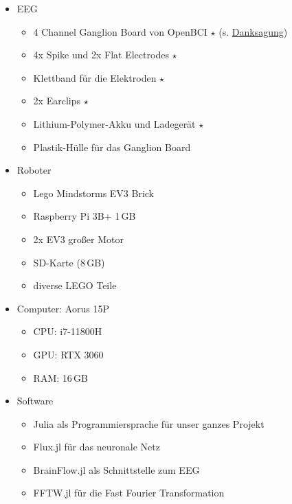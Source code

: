 \documentclass[11pt]{scrartcl}
\begin{document}
	\begin{itemize}
		\item EEG
		\begin{itemize}
			\item 4 Channel Ganglion Board von OpenBCI $\star$ (s. \hyperref[Foerderverein]{Danksagung})
			\item 4x Spike und 2x Flat Electrodes  $\star$
			\item Klettband für die Elektroden $\star$
			\item 2x Earclips $\star$
			\item Lithium-Polymer-Akku und Ladegerät $\star$
			\item Plastik-Hülle für das Ganglion Board
		\end{itemize}

		\item Roboter
		\begin{itemize}
			\item Lego Mindstorms EV3 Brick
			\item Raspberry Pi 3B+ 1\,GB
			\item 2x EV3 großer Motor
			\item SD-Karte (8\,GB)
			\item diverse LEGO Teile
		\end{itemize}

		\item Computer: Aorus 15P
		\begin{itemize}
			\item CPU: i7-11800H
			\item GPU: RTX 3060
			\item RAM: 16\,GB
		\end{itemize}

		\item Software
		\begin{itemize}
			\item Julia als Programmiersprache für unser ganzes Projekt \cite{julia}
			\item Flux.jl für das neuronale Netz
				\cite{Flux.jl-2018}
				\cite{innes:2018}
			
			\item BrainFlow.jl als Schnittstelle zum EEG
				\cite{brainflow}
			
			\item FFTW.jl für die Fast Fourier Transformation
				\cite{FFTW.jl-2005}
			

\end{itemize}
\end{itemize}
\end{document}
